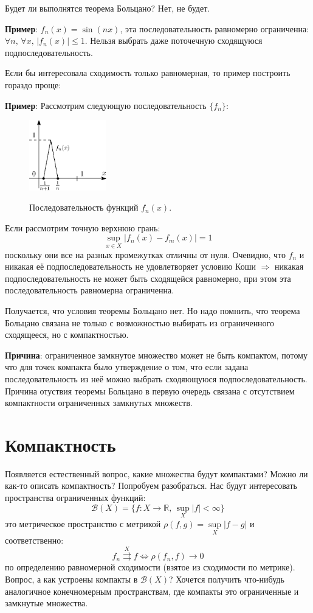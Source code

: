 \documentclass[12pt]{article}
\newcommand{\MR}{\mathbb{R}}
\newcommand{\MB}{\mathcal{B}}
\theoremstyle{definition}
\newcommand{\uconv}[1]{\overset{#1}{\rightrightarrows}}
\begin{document}
Будет ли выполнятся теорема Больцано? Нет, не будет. 

\textbf{Пример}: $f_n(x) = \sin{(nx)}$, эта последовательность равномерно ограниченна: $\forall n, \, \forall x, \, |f_n(x)| \leq 1$. Нельзя выбрать даже поточечную сходящуюся подпоследовательность.

Если бы интересовала сходимость только равномерная, то пример построить гораздо проще:

\textbf{Пример}: Рассмотрим следующую последовательность $\{f_n\}$:
\begin{figure}[H]
	\centering
	\includegraphics[width=0.3\textwidth]{MA3L10_1.eps}
	\label{10_1}
	\caption{Последовательность функций $f_n(x)$.}
	\label{fig:Равномерная сходимость	}
\end{figure}
Если рассмотрим точную верхнюю грань:
$$
	\sup\limits_{x \in X}|f_n(x) - f_m(x)| = 1
$$
поскольку они все на разных промежутках отличны от нуля. Очевидно, что $f_n$ и никакая её подпоследовательность не удовлетворяет условию Коши $\Rightarrow$ никакая подпоследовательность не может быть сходящейся равномерно, при этом эта последовательность равномерна ограниченна.

Получается, что условия теоремы Больцано нет. Но надо помнить, что 	теорема Больцано связана не только с возможностью выбирать из ограниченного сходящееся, но с компактностью.

\textbf{Причина}: ограниченное замкнутое множество может не быть компактом, потому что для точек компакта было утверждение о том, что если задана последовательность из неё можно выбрать сходяющуюся подпоследовательность. Причина отуствия теоремы Больцано в первую очередь связана с отсутствием компактности ограниченных замкнутых множеств. 

\newpage
\section*{Компактность}
Появляется естественный вопрос, какие множества будут компактами? Можно ли как-то описать компактность? Попробуем разобраться. Нас будут интересовать пространства ограниченных функций: 
$$
	\MB(X) = \{f \colon X \to \MR,\, \sup\limits_{X}|f| <  \infty \}
$$ 
это метрическое пространство с метрикой $\rho(f,g) = \sup\limits_{X}|f - g|$ и соответственно:
$$
	f_n \uconv{X}f \Leftrightarrow \rho(f_n,f) \to 0
$$
по определению равномерной сходимости (взятое из сходимости по метрике). Вопрос, а как устроены компакты в $\MB(X)$? Хочется получить что-нибудь аналогичное конечномерным пространствам, где компакты это ограниченные и замкнутые множества.
\end{document}
